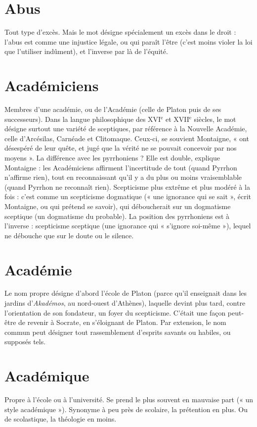 \section{Abus}
Tout type d’excès. Mais le mot désigne spécialement un excès dans le
droit : l’abus est comme une injustice légale, ou qui paraît l’être (c’est
moins violer la loi que l'utiliser indûment), et l'inverse par là de l'équité.

\section{Académiciens}
Membres d’une académie, ou de l’Académie (celle de
Platon puis de ses successeurs). Dans la langue philosophique
des {\footnotesize XVI$^\text{e}$} et {\footnotesize XVII$^\text{e}$} siècles,
le mot désigne surtout une variété de sceptiques,
par référence à la Nouvelle Académie, celle d’Arcésilas, Carnéade et Clitomaque.
Ceux-ci, se souvient Montaigne, « ont désespéré de leur quête, et jugé
que la vérité ne se pouvait concevoir par nos moyens ». La différence avec les
pyrrhoniens ? Elle est double, explique Montaigne : les Académiciens affirment
l'incertitude de tout (quand Pyrrhon n’affirme rien), tout en reconnaissant
qu’il y a du plus ou moins vraisemblable (quand Pyrrhon ne reconnaît rien).
Scepticisme plus extrême et plus modéré à la fois : c’est comme un scepticisme
dogmatique (« une ignorance qui se sait », écrit Montaigne, ou qui prétend se
savoir), qui déboucherait sur un dogmatisme sceptique (un dogmatisme du
probable). La position des pyrrhoniens est à l’inverse : scepticisme sceptique
(une ignorance qui « s’ignore soi-même »), lequel ne débouche que sur le doute
ou le silence.

\section{Académie}
Le nom propre désigne d’abord l’école de Platon (parce qu’il
enseignait dans les jardins d’{\it Akadémos}, au nord-ouest d’Athènes),
laquelle devint plus tard, contre l'orientation de son fondateur, un foyer du
scepticisme. C’était une façon peut-être de revenir à Socrate, en s’éloignant de
Platon.
Par extension, le nom commun peut désigner tout rassemblement d’esprits
savants ou habiles, ou supposés tels.

\section{Académique}
Propre à l’école ou à l’université. Se prend le plus souvent
en mauvaise part (« un style académique »). Synonyme à
peu près de scolaire, la prétention en plus. Ou de scolastique, la théologie en
moins.

